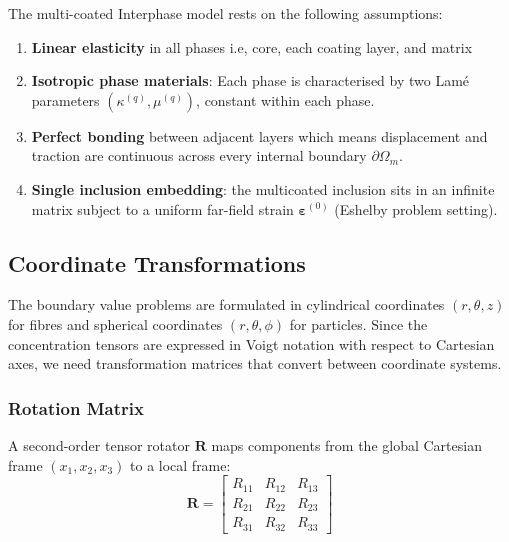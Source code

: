 \documentclass[oneside, 12pt, a4paper, bibliography=totoc]{book}
\newcommand{\bs}[1]{\bm{#1}}                       %
\begin{document}
The multi-coated Interphase model rests on the following assumptions:

\begin{enumerate}
    \item \textbf{Linear elasticity} in all phases i.e, core, each coating layer, and matrix 
    \item \textbf{Isotropic phase materials}: Each phase is characterised by two Lam\'{e} parameters $(\kappa^{(q)}, \mu^{(q)})$, constant within each phase.
    \item \textbf{Perfect bonding} between adjacent layers which means displacement and traction are continuous across every internal boundary $\partial\Omega_m$.
    \item \textbf{Single inclusion embedding}: the multicoated inclusion sits in an infinite matrix subject to a uniform far-field strain $\bs{\varepsilon}^{(0)}$ (Eshelby problem setting).
\end{enumerate}

\subsection{Coordinate Transformations}
\label{sec:coordinate_transform}

The boundary value problems are formulated in cylindrical coordinates $(r, \theta, z)$ for fibres and spherical coordinates $(r, \theta, \phi)$ for particles. Since the concentration tensors are expressed in Voigt notation with respect to Cartesian axes, we need transformation matrices that convert between coordinate systems.

\subsubsection{Rotation Matrix}
\label{subsec:rotation_matrix}

A second-order tensor rotator $\bs{R}$ maps components from the global Cartesian frame $(x_1, x_2, x_3)$ to a local frame:
%
\begin{equation}
    \bs{R} =
    \begin{bmatrix}
        R_{11} & R_{12} & R_{13} \\
        R_{21} & R_{22} & R_{23} \\
        R_{31} & R_{32} & R_{33}
    \end{bmatrix}
    \label{eq:rotation_matrix}
\end{equation}
\end{document}
